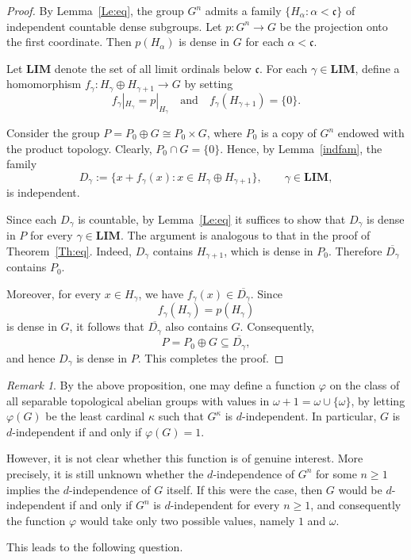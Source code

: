 \documentclass[12pt]{amsart}
\theoremstyle{definition}
\theoremstyle{remark}
\newtheorem{remark}[theorem]{Remark}
\begin{document}
\begin{proof}
By Lemma~\ref{Le:eq}, the group $G^n$ admits a family
$\{H_\alpha:\alpha<\mathfrak{c}\}$ of independent countable dense subgroups.
Let $p\colon G^n\to G$ be the projection onto the first coordinate.
Then $p(H_\alpha)$ is dense in $G$ for each $\alpha<\mathfrak{c}$.

Let $\mathbf{LIM}$ denote the set of all limit ordinals below $\mathfrak{c}$.
For each $\gamma\in\mathbf{LIM}$, define a homomorphism
$f_\gamma\colon H_\gamma\oplus H_{\gamma+1}\to G$ by setting
\[
f_\gamma|_{H_\gamma}=p|_{H_\gamma}
\quad\text{and}\quad
f_\gamma(H_{\gamma+1})=\{0\}.
\]

Consider the group $P=P_0\oplus G\cong P_0\times G$, where $P_0$ is a copy of $G^n$ endowed
with the product topology.
Clearly, $P_0\cap G=\{0\}$.
Hence, by Lemma~\ref{indfam}, the family
\[
D_\gamma:=\{x+f_\gamma(x):x\in H_\gamma\oplus H_{\gamma+1}\},
\qquad \gamma\in\mathbf{LIM},
\]
is independent.

Since each $D_\gamma$ is countable, by Lemma~\ref{Le:eq} it suffices to show
that $D_\gamma$ is dense in $P$ for every $\gamma\in\mathbf{LIM}$.
The argument is analogous to that in the proof of Theorem~\ref{Th:eq}.
Indeed, $D_\gamma$ contains $H_{\gamma+1}$, which is dense in $P_0$.
Therefore $\overline{D_\gamma}$ contains $P_0$.

Moreover, for every $x\in H_\gamma$, we have
$f_\gamma(x)\in\overline{D_\gamma}$.
Since
\[
f_\gamma(H_\gamma)=p(H_\gamma)
\]
is dense in $G$, it follows that $\overline{D_\gamma}$ also contains $G$.
Consequently,
\[
P=P_0\oplus G\subseteq \overline{D_\gamma},
\]
and hence $D_\gamma$ is dense in $P$.
This completes the proof.
\end{proof}


\begin{remark}
By the above proposition, one may define a function $\varphi$ on the class of
all separable topological abelian groups with values in
$\omega + 1=\omega\cup\{\omega\}$, by letting $\varphi(G)$ be the least cardinal
$\kappa$ such that $G^\kappa$ is $d$-independent.
In particular, $G$ is $d$-independent if and only if $\varphi(G)=1$.

However, it is not clear whether this function is of genuine interest.
More precisely, it is still unknown whether the $d$-independence of $G^n$
for some $n\geq 1$ implies the $d$-independence of $G$ itself.
If this were the case, then $G$ would be $d$-independent if and only if
$G^n$ is $d$-independent for every $n\geq 1$, and consequently the function
$\varphi$ would take only two possible values, namely $1$ and $\omega$.

This leads to the following question.
\end{remark}
\end{document}
